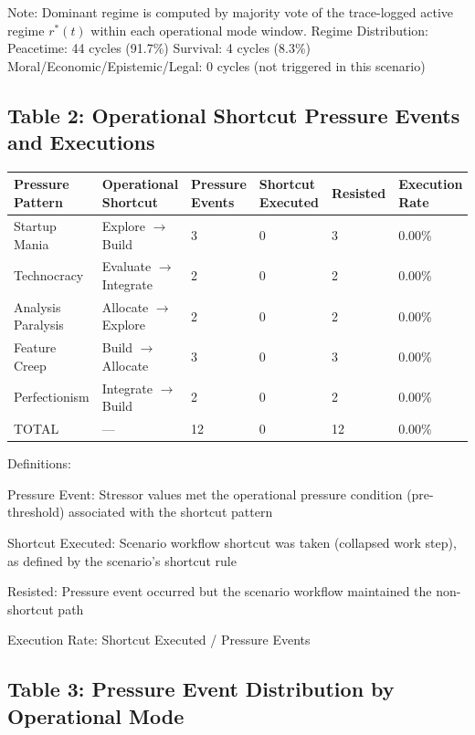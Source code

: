 \documentclass[11pt,a4paper]{article}
\begin{document}
Note: Dominant regime is computed by majority vote of the trace-logged active regime $r^*(t)$ within each operational mode window. Regime Distribution: Peacetime: 44 cycles (91.7\%) Survival: 4 cycles (8.3\%) Moral/Economic/Epistemic/Legal: 0 cycles (not triggered in this scenario)

\subsection*{Table 2: Operational Shortcut Pressure Events and Executions}

\begin{center}
\begin{tabular}{llllll}
\toprule
\textbf{Pressure Pattern} & \textbf{Operational Shortcut} & \textbf{Pressure Events} & \textbf{Shortcut Executed} & \textbf{Resisted} & \textbf{Execution Rate} \\
\midrule
Startup Mania & Explore $\to$ Build & 3 & 0 & 3 & 0.00\% \\
Technocracy & Evaluate $\to$ Integrate & 2 & 0 & 2 & 0.00\% \\
Analysis Paralysis & Allocate $\to$ Explore & 2 & 0 & 2 & 0.00\% \\
Feature Creep & Build $\to$ Allocate & 3 & 0 & 3 & 0.00\% \\
Perfectionism & Integrate $\to$ Build & 2 & 0 & 2 & 0.00\% \\
\midrule
TOTAL & --- & 12 & 0 & 12 & 0.00\% \\
\bottomrule
\end{tabular}
\end{center}

Definitions:

Pressure Event: Stressor values met the operational pressure condition (pre-threshold) associated with the shortcut pattern

Shortcut Executed: Scenario workflow shortcut was taken (collapsed work step), as defined by the scenario's shortcut rule

Resisted: Pressure event occurred but the scenario workflow maintained the non-shortcut path

Execution Rate: Shortcut Executed / Pressure Events

\subsection*{Table 3: Pressure Event Distribution by Operational Mode}
\end{document}
